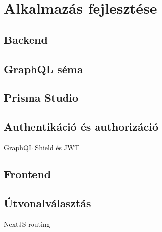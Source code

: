 
\chapter{Alkalmazás fejlesztése}

\section{Backend}


\section{GraphQL séma}


\section{Prisma Studio}


\section{Authentikáció és authorizáció}
GraphQL Shield és JWT


\section{Frontend}

\section{Útvonalválasztás}
NextJS routing

